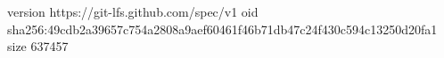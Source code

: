 version https://git-lfs.github.com/spec/v1
oid sha256:49cdb2a39657c754a2808a9aef60461f46b71db47c24f430c594c13250d20fa1
size 637457
